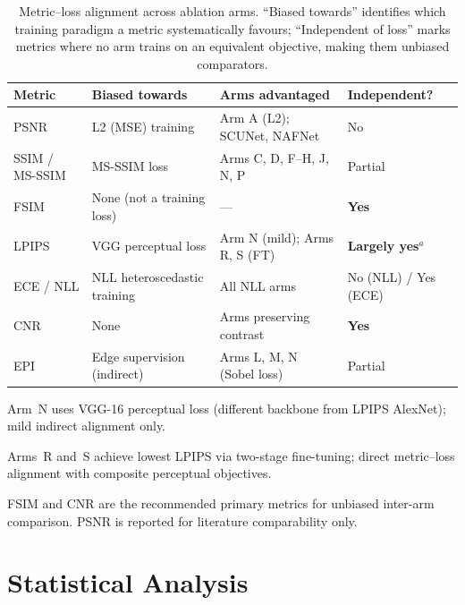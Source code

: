 \documentclass[12pt, a4paper, twoside, openright]{book}
\begin{document}
\begin{table}[htbp]
\centering
\caption[Metric--loss alignment summary]{Metric--loss alignment across ablation arms. ``Biased towards'' identifies which training paradigm a metric systematically favours; ``Independent of loss'' marks metrics where no arm trains on an equivalent objective, making them unbiased comparators.}
\label{tab:methods:metric_alignment}
\begin{threeparttable}
\small
\begin{tabular}{llll}
\toprule
\textbf{Metric} & \textbf{Biased towards} & \textbf{Arms advantaged} & \textbf{Independent?} \\
\midrule
PSNR        & L2 (MSE) training     & Arm A (L2); SCUNet, NAFNet & No \\
SSIM / MS-SSIM & MS-SSIM loss       & Arms C, D, F--H, J, N, P  & Partial \\
FSIM        & None (not a training loss) & ---                   & \textbf{Yes} \\
LPIPS       & VGG perceptual loss   & Arm N (mild); Arms R, S (FT) & \textbf{Largely yes}$^a$ \\
ECE / NLL   & NLL heteroscedastic training & All NLL arms      & No (NLL) / Yes (ECE) \\
CNR         & None                  & Arms preserving contrast   & \textbf{Yes} \\
EPI         & Edge supervision (indirect) & Arms L, M, N (Sobel loss) & Partial \\
\bottomrule
\end{tabular}
\begin{tablenotes}
\footnotesize
\item[$a$] Arm~N uses VGG-16 perceptual loss (different backbone from LPIPS AlexNet); mild indirect alignment only.
\item Arms~R and~S achieve lowest LPIPS via two-stage fine-tuning; direct metric--loss alignment with composite perceptual objectives.
\item FSIM and CNR are the recommended primary metrics for unbiased inter-arm comparison. PSNR is reported for literature comparability only.
\end{tablenotes}
\end{threeparttable}
\end{table}

\section{Statistical Analysis}
\label{sec:methods:stats}
\end{document}
